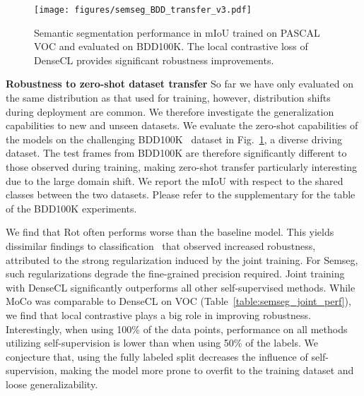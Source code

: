 \documentclass[10pt,twocolumn,letterpaper]{article}
\newcommand{\parsection}[1]{\vspace{1mm}\noindent\textbf{#1 }}
\begin{document}
\begin{figure}[t]
 \centering
  \texttt{[image: figures/semseg\_BDD\_transfer\_v3.pdf]}
\caption{Semantic segmentation performance in mIoU trained on PASCAL VOC and evaluated on BDD100K. The local contrastive loss of DenseCL provides significant robustness improvements.}
\label{fig:semseg_zeroshot}
\vspace{-0.2in}
\end{figure}

\parsection{Robustness to zero-shot dataset transfer}
So far we have only evaluated on the same distribution as that used for training, however, distribution shifts during deployment are common.
We therefore investigate the generalization capabilities to new and unseen datasets. 
We evaluate the zero-shot capabilities of the models on the challenging BDD100K~\cite{yu2020bdd100k} dataset in Fig.~\ref{fig:semseg_zeroshot}, a diverse driving dataset. 
The test frames from BDD100K are therefore significantly different to those observed during training, making zero-shot transfer particularly interesting due to the large domain shift. 
We report the mIoU with respect to the shared classes between the two datasets. Please refer to the supplementary for the table of the BDD100K experiments.

We find that Rot often performs worse than the baseline model. 
This yields dissimilar findings to classification~\cite{hendrycks2019using} that observed increased robustness, attributed to the strong regularization induced by the joint training.
For Semseg, such regularizations degrade the fine-grained precision required. 
Joint training with DenseCL significantly outperforms all other self-supervised methods. 
While MoCo was comparable to DenseCL on VOC (Table~\ref{table:semseg_joint_perf}), we find that local contrastive plays a big role in improving robustness. 
Interestingly, when using 100\% of the data points, performance on all methods utilizing self-supervision is lower than when using 50\% of the labels. 
We conjecture that, using the fully labeled split decreases the influence of self-supervision, making the model more prone to overfit to the training dataset and loose generalizability. 
\end{document}
